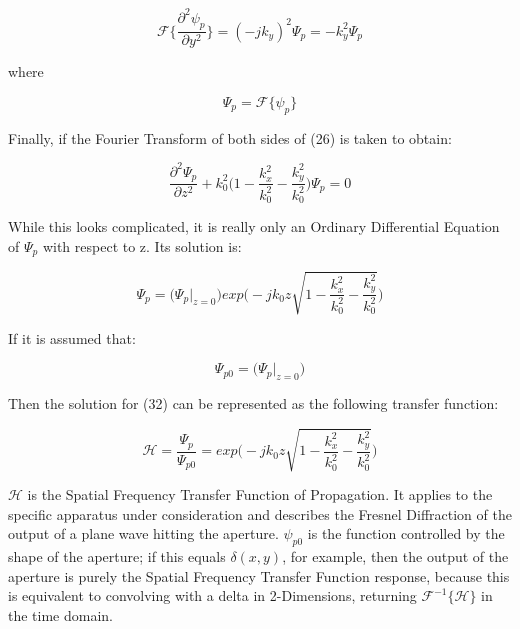 \documentclass[12pt]{article}
\begin{document}
\begin{equation}
	\mathscr{F} \Big\{ \frac{\partial^2 \psi_{p}}{\partial y^2} \Big\} = (-jk_{y})^2\Psi_{p} = -k_{y}^2\Psi_{p}
\end{equation}

where

\begin{equation}
	\Psi_{p} = \mathscr{F} \{\psi_{p}\}
\end{equation}

Finally, if the Fourier Transform of both sides of (26) is taken to obtain:

\begin{equation}
	\frac{\partial^2\Psi_{p}}{\partial z^2} + k_{0}^{2} \bigg ( 1 - \frac{k_{x}^2}{k_{0}^2} - \frac{k_{y}^2}{k_{0}^2} \bigg ) \Psi_{p} = 0
\end{equation}

While this looks complicated, it is really only an Ordinary Differential Equation of \(\Psi_{p}\) with respect to z. Its solution is:

\begin{equation}
	\Psi_{p} = \big(\Psi_{p}\vert_{z = 0}\big) exp\Bigg(-jk_{0}z\sqrt{1 - \frac{k_{x}^2}{k_{0}^2} - \frac{k_{y}^2}{k_{0}^2}}\Bigg)
\end{equation}

If it is assumed that:

\begin{equation}
	\Psi_{p0} = \big(\Psi_{p}\vert_{z = 0}\big)
\end{equation}

Then the solution for (32) can be represented as the following transfer function:

\begin{equation}
	\mathscr{H} = \frac{\Psi_{p}}{\Psi_{p0}} = exp\Bigg(-jk_{0}z\sqrt{1 - \frac{k_{x}^2}{k_{0}^2} - \frac{k_{y}^2}{k_{0}^2}}\Bigg)
\end{equation}

\(\mathscr{H}\) is the Spatial Frequency Transfer Function of Propagation. It applies to the specific apparatus under consideration and describes the Fresnel Diffraction of the output of a plane wave hitting the aperture. \(\psi_{p0}\) is the function controlled by the shape of the aperture; if this equals \(\delta(x,y)\), for example, then the output of the aperture is purely the Spatial Frequency Transfer Function response, because this is equivalent to convolving with a delta in 2-Dimensions, returning \(\mathscr{F}^{-1} \{\mathscr{H}\} \) in the time domain.
\end{document}
